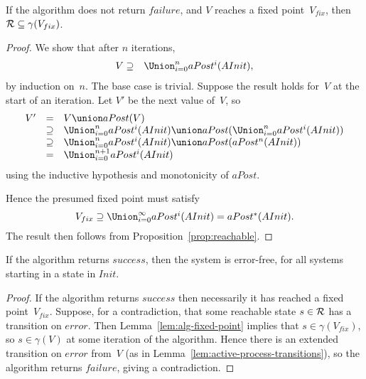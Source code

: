 \begin{lemma}
\label{lem:alg-fixed-point}
If the algorithm does not return $failure$, and $V$ reaches a fixed
point~$V_{fix}$, then $\mathcal{R} \subseteq \gamma( {V_{fix}} )$.
\end{lemma}
%
\begin{proof}
We show that after $n$ iterations,
\begin{eqnarray*}
{V} & \supseteq & \textstyle\Union_{i = 0}^n aPost^i({AInit}),
\end{eqnarray*}
%
by induction on~$n$.  The base case is trivial.  Suppose the result holds
for~$V$ at the start of an iteration.  Let $V'$ be the next value of~$V$, so
\[
\begin{array}{rcl}
{V'} %
& = & {V} \union aPost({V}) \\
& \supseteq & \Union_{i = 0}^n aPost^i({AInit}) \union
      aPost(\Union_{i = 0}^n aPost^i({AInit})) \\
& \supseteq & \Union_{i = 0}^n aPost^i({AInit}) \union 
  aPost(aPost^n({AInit})) \\
& = & \Union_{i = 0}^{n+1} aPost^i({AInit})
\end{array}
\] 
using the inductive hypothesis and monotonicity of $aPost$. 

Hence the presumed fixed point must satisfy
\[
{V_{fix}} \supseteq  \textstyle\Union_{i = 0}^\infty aPost^i({AInit}) = 
  aPost^*({AInit}).
\]
The result then follows from Proposition~\ref{prop:reachable}.
\end{proof}


\begin{prop}
If the algorithm returns $success$, then the system is error-free, for all
systems starting in a state in $Init$.
\end{prop}
%
\begin{proof}
If the algorithm returns $success$ then necessarily it has reached a fixed
point~$V_{fix}$.  Suppose, for a contradiction, that some reachable state $s
\in \mathcal{R}$ has a transition on $error$.  Then Lemma~\ref{lem:alg-fixed-point}
implies that $s \in \gamma({V_{fix}})$, so $s \in \gamma({V})$ at some
iteration of the algorithm.  Hence there is an extended transition on $error$
from~${V}$ (as in Lemma~\ref{lem:active-process-transitions}), so the
algorithm returns $failure$, giving a contradiction.
\end{proof}


